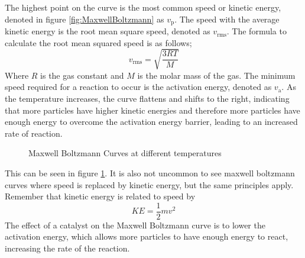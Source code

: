 The highest point on the curve is the most common speed or kinetic energy, denoted in figure \ref{fig:MaxwellBoltzmann} as $v_\text{p}$. The speed with the average kinetic energy is the root mean square speed, denoted as $v_\text{rms}$. The formula to calculate the root mean squared speed is as follows;
\begin{equation}\label{eq:vrms}
v_\text{rms} = \sqrt{\frac{3RT}{M}}
\end{equation}
Where $R$ is the gas constant and $M$ is the molar mass of the gas. The minimum speed required for a reaction to occur is the activation energy, denoted as $v_\text{a}$. As the temperature increases, the curve flattens and shifts to the right, indicating that more particles have higher kinetic energies and therefore more particles have enough energy to overcome the activation energy barrier, leading to an increased rate of reaction. 
\begin{figure}[h]
    \centering
    \caption{Maxwell Boltzmann Curves at different temperatures}
    \label{fig:MaxwellBoltzmann2}
\end{figure}
This can be seen in figure \ref{fig:MaxwellBoltzmann2}. It is also not uncommon to see maxwell boltzmann curves where speed is replaced by kinetic energy, but the same principles apply. Remember that kinetic energy is related to speed by
\begin{equation}\label{eq:KE}
    KE = \frac{1}{2}mv^2
\end{equation}
The effect of a catalyst on the Maxwell Boltzmann curve is to lower the activation energy, which allows more particles to have enough energy to react, increasing the rate of the reaction.
